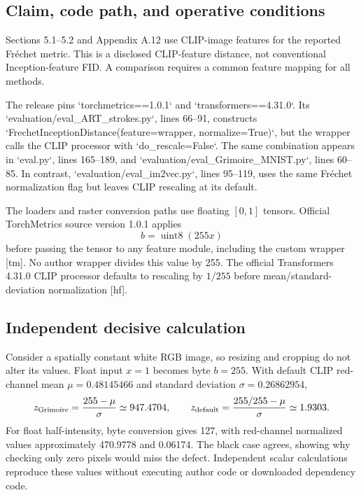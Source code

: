 \documentclass[10pt]{article}
\begin{document}
\subsection*{Claim, code path, and operative conditions}
Sections 5.1–5.2 and Appendix A.12 use CLIP-image features for the reported Fréchet metric. This is a disclosed CLIP-feature distance, not conventional Inception-feature FID. A comparison requires a common feature mapping for all methods.\par
The release pins `torchmetrics==1.0.1` and `transformers==4.31.0`. Its `evaluation/eval\_ART\_strokes.py`, lines 66–91, constructs `FrechetInceptionDistance(feature=wrapper, normalize=True)`, but the wrapper calls the CLIP processor with `do\_rescale=False`. The same combination appears in `eval.py`, lines 165–189, and `evaluation/eval\_Grimoire\_MNIST.py`, lines 60–85. In contrast, `evaluation/eval\_im2vec.py`, lines 95–119, uses the same Fréchet normalization flag but leaves CLIP rescaling at its default.\par
The loaders and raster conversion paths use floating \([0,1]\) tensors. Official TorchMetrics source version 1.0.1 applies \[b=\operatorname{uint8}(255x)\] before passing the tensor to any feature module, including the custom wrapper [tm]. No author wrapper divides this value by 255. The official Transformers 4.31.0 CLIP processor defaults to rescaling by \(1/255\) before mean/standard-deviation normalization [hf].\par
\subsection*{Independent decisive calculation}
Consider a spatially constant white RGB image, so resizing and cropping do not alter its values. Float input \(x=1\) becomes byte \(b=255\). With default CLIP red-channel mean \(\mu=0.48145466\) and standard deviation \(\sigma=0.26862954\), \[z_{\rm Grimoire}=\frac{255-\mu}{\sigma}\simeq947.4704,
 \qquad
 z_{\rm default}=\frac{255/255-\mu}{\sigma}\simeq1.9303.\] For float half-intensity, byte conversion gives 127, with red-channel normalized values approximately 470.9778 and 0.06174. The black case agrees, showing why checking only zero pixels would miss the defect. Independent scalar calculations reproduce these values without executing author code or downloaded dependency code.\par
\end{document}

